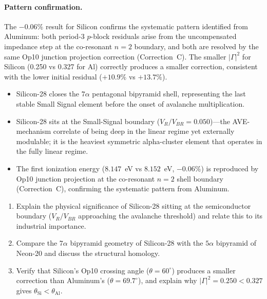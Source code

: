 \paragraph{Pattern confirmation.}
The $-0.06\%$ result for Silicon confirms the systematic pattern identified from Aluminum: both period-3 $p$-block residuals arise from the uncompensated impedance step at the co-resonant $n = 2$ boundary, and both are resolved by the same Op10 junction projection correction (Correction~C).  The smaller $|\Gamma|^2$ for Silicon (0.250 vs 0.327 for Al) correctly produces a smaller correction, consistent with the lower initial residual ($+10.9\%$ vs $+13.7\%$).

\begin{summarybox}
\begin{itemize}
    \item Silicon-28 closes the $7\alpha$ pentagonal bipyramid shell, representing the last stable Small Signal element before the onset of avalanche multiplication.
    \item Silicon-28 sits at the Small-Signal boundary ($V_R/V_{BR} = 0.050$)---the AVE-mechanism correlate of being deep in the linear regime yet externally modulable; it is the heaviest symmetric alpha-cluster element that operates in the fully linear regime.
    \item The first ionization energy ($8.147$~eV vs $8.152$~eV, $-0.06\%$) is reproduced by Op10 junction projection at the co-resonant $n = 2$ shell boundary (Correction~C), confirming the systematic pattern from Aluminum.
\end{itemize}
\end{summarybox}

\begin{exercisebox}
\begin{enumerate}
    \item Explain the physical significance of Silicon-28 sitting at the semiconductor boundary ($V_R/V_{BR}$ approaching the avalanche threshold) and relate this to its industrial importance.
    \item Compare the $7\alpha$ bipyramid geometry of Silicon-28 with the $5\alpha$ bipyramid of Neon-20 and discuss the structural homology.
    \item Verify that Silicon's Op10 crossing angle ($\theta = 60^\circ$) produces a smaller correction than Aluminum's ($\theta = 69.7^\circ$), and explain why $|\Gamma|^2 = 0.250 < 0.327$ gives $\theta_\text{Si} < \theta_\text{Al}$.
\end{enumerate}
\end{exercisebox}

